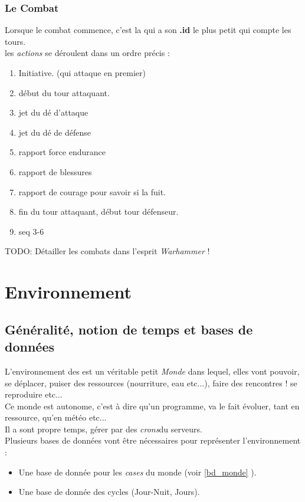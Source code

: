 \documentclass[french]{report}
\begin{document}
\section{Le Combat}
Lorsque le combat commence, c'est la \CoCiX qui a son \textbf{.id} le plus petit qui compte les tours.\\
les \textit{actions} se déroulent dans un ordre précis : \\

\begin{enumerate}
	\item Initiative. (qui attaque en premier)
	\item début du tour attaquant.
	\item jet du dé d'attaque
	\item jet du dé de défense
	\item rapport force endurance
	\item rapport de blessures
	\item rapport de courage pour savoir si la \CoCiX fuit.
	\item fin du tour attaquant, début tour défenseur.
	\item seq 3-6\\
\end{enumerate}

{\large TODO: Détailler les combats dans l'esprit \textit{Warhammer} !}


\newpage
\part{Environnement}\label{environnement}
\chapter{Généralité, notion de temps et bases de données}\label{jour_nuit}

L'environnement des \CoCiX est un véritable petit \textit{Monde} dans lequel, elles vont pouvoir, se déplacer, puiser des ressources (nourriture, eau etc...), faire des rencontres ! se reproduire etc...\\
Ce monde est autonome, c'est à dire qu'un programme, va le fait évoluer, tant en ressource, qu'en météo etc...\\

Il a sont propre temps, gérer par des \textit{crons}\footnotemark[1] du serveurs.\\
Plusieurs bases de données vont être nécessaires pour représenter l'environnement : \\
\begin{itemize}
	\item Une base de donnée pour les \textit{cases} du monde (voir \ref{bd_monde} ).
	\item Une base de donnée des cycles (Jour-Nuit, Jours).\\
\end{itemize}
\end{document}
